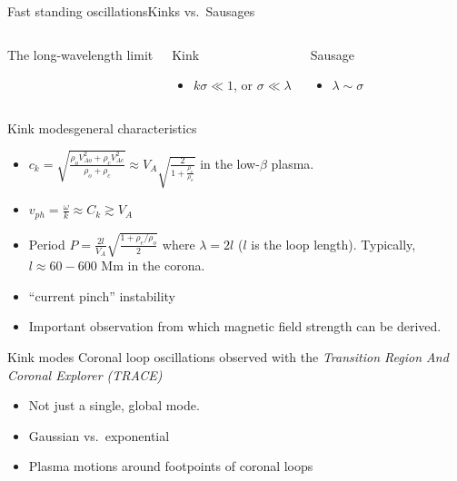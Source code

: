 \documentclass[table]{beamer}
\begin{document}
\begin{frame}{Fast standing oscillations}{Kinks vs.\ Sausages}
\begin{columns}
        The long-wavelength limit
    \begin{block}{Kink}
        \begin{itemize}
            \item $k\sigma \ll 1$, or $\sigma\ll\lambda$
        \end{itemize}
    \end{block}
    \begin{block}{Sausage}
        \begin{itemize}
            \item $\lambda\sim\sigma$
        \end{itemize}
    \end{block}
\end{columns}
\end{frame}%
\begin{frame}{Kink modes}{general characteristics}
    \begin{itemize}
        \item $c_k=\sqrt{\frac{\rho_oV_{Ao}^2 + \rho_cV_{Ac}^2}
            {\rho_o + \rho_c}}
            \approx V_A\sqrt{\frac{2}{1+\frac{\rho_e}{\rho_o}}} $
            in the low-$\beta$ plasma.
        \item $v_{ph} = \frac{\omega}{k} \approx C_k \gtrsim V_A $
        \item Period $P=\frac{2l}{V_A}\sqrt{\frac{1+\rho_e/\rho_o}{2}}$
            where $\lambda=2l$ ($l$ is the loop length).
            Typically, $l \approx 60-600$ Mm in the corona.
        \item ``current pinch'' instability
        \item Important observation from which magnetic field strength
            can be derived.
    \end{itemize}
\end{frame}%
\begin{frame}{Kink modes}
{Coronal loop oscillations observed with the
\emph{Transition Region And Coronal Explorer (TRACE)}}
    \begin{itemize}
        \item Not just a single, global mode.
        \item Gaussian vs.\ exponential
        \item Plasma motions around footpoints of coronal loops
    \end{itemize}
\end{frame}%
\end{document}
